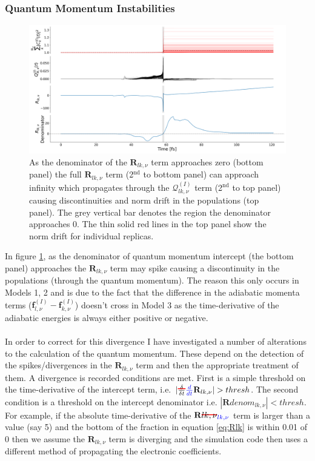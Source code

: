 \subsubsection{Quantum Momentum Instabilities}
\label{sect:QlkSpikes}
\begin{figure}[ht]
	\includegraphics[width=\textwidth]{../img/CTMQC/TullyModels/Spikes/RlkDenom_Rlk_Qlk_Norm.png}
	\caption{\label{fig:QlkSpike}As the denominator of the $\mathbf{R}_{lk,\nu}$ term approaches zero (bottom panel) the full $\mathbf{R}_{lk, \nu}$ term (2$^{\text{nd}}$ to bottom panel) can approach infinity which propagates through the $\mathcal{Q}_{lk, \nu}^{(I)}$ term (2$^{\text{nd}}$ to top panel) causing discontinuities and norm drift in the populations (top panel). The grey vertical bar denotes the region the denominator approaches 0. The thin solid red lines in the top panel show the norm drift for individual replicas.}
\end{figure}
\noindent In figure \ref{fig:QlkSpike}, as the denominator of quantum momentum intercept (the bottom panel) approaches  the $\mathbf{R}_{lk, \nu}$ term may spike causing a discontinuity in the populations (through the quantum momentum). The reason this only occurs in Models 1, 2 and  is due to the fact that the difference in the adiabatic momenta terms ($\mathbf{f}_{l, \nu}^{(I)} - \mathbf{f}_{k, \nu}^{(I)}$) doesn't cross  in Model 3 as the time-derivative of the adiabatic energies is always either positive or negative. 
\\\\
In order to correct for this divergence I have investigated a number of alterations to the calculation of the quantum momentum. These depend on the detection of the spikes/divergences in the $\mathbf{R}_{lk, \nu}$ term and then the appropriate treatment of them. A divergence is recorded  conditions are met. First is a simple threshold on the time-derivative of the intercept term, i.e. $|\mremove{\frac{\delta}{\delta t}}\madd{\frac{d}{dt}} \mathbf{R}_{lk, \nu}| > thresh$. The second condition is a threshold on the intercept denominator i.e. $|\mathbf{R}denom_{lk, \nu}| < thresh$. For example, if the absolute time-derivative of the $\mathbf{R}\mremove{{lk, \nu}}\madd{_{lk, \nu}}$ term is larger than a value (say 5) and the bottom of the fraction in equation \eqref{eq:Rlk} is within 0.01 of 0 then we assume the $\mathbf{R}_{lk, \nu}$ term is diverging and the simulation code then uses a different method of propagating the electronic coefficients.
